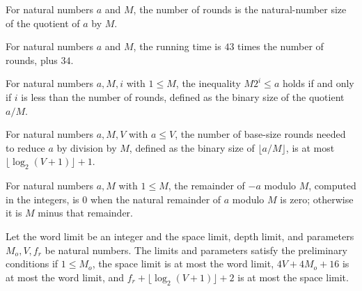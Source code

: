 \begin{definition}
\label{Light.emodRounds}
\leanok
For natural numbers $a$ and $M$, the number of rounds is the natural-number size of the
quotient of $a$ by $M$.
\end{definition}

\begin{definition}
\label{Light.emodTime}
\leanok
{}
For natural numbers $a$ and $M$, the running time is $43$ times the number of rounds,
plus $34$.
\end{definition}

\begin{theorem}
\label{Light.mul_two_pow_le_iff}
\leanok
{}
For natural numbers $a,M,i$ with $1\le M$, the inequality $M2^i\le a$ holds if and only
if $i$ is less than the number of rounds, defined as the binary size of the quotient
$a/M$.
\end{theorem}

\begin{theorem}
\label{Light.emodRounds_le}
\leanok
{}
For natural numbers $a,M,V$ with $a\le V$, the number of base-size rounds needed to
reduce $a$ by division by $M$, defined as the binary size of $\lfloor a/M\rfloor$, is at
most $\lfloor\log_2(V+1)\rfloor+1$.
\end{theorem}

\begin{theorem}
\label{Light.neg_emod_nat}
\leanok
{}
For natural numbers $a,M$ with $1\le M$, the remainder of $-a$ modulo $M$, computed in
the integers, is $0$ when the natural remainder of $a$ modulo $M$ is zero; otherwise it
is $M$ minus that remainder.
\end{theorem}

\begin{definition}
\label{Light.Emod.Pre}
\leanok
{}
Let the word limit be an integer and the space limit, depth limit, and parameters
$M_o,V,f_r$ be natural numbers. The limits and parameters satisfy the preliminary
conditions if $1\le M_o$, the space limit is at most the word limit, $4V+4M_o+16$ is at
most the word limit, and $f_r+\lfloor\log_2(V+1)\rfloor+2$ is at most the space limit.
\end{definition}

